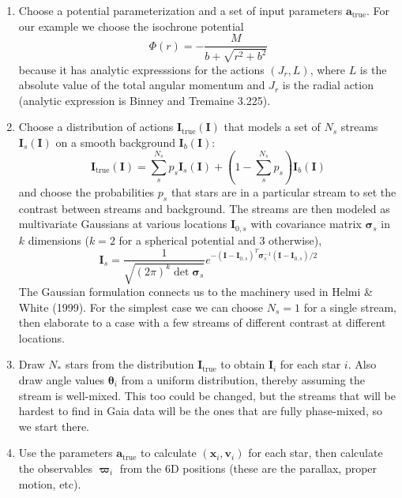 \documentclass[useAMS,usenatbib,a4paper,referee]{mn2e}
\newcommand{\sub}[2]{\ensuremath{#1_{\mathrm{#2}}}}
\begin{document}
\begin{enumerate}
 \item Choose a potential parameterization and a set of input parameters $\sub{\mathbf{a}}{true}$. For our example we choose the isochrone potential
\begin{equation}
 \Phi(r) = -\frac{M}{b+\sqrt{r^2+b^2}}
\end{equation} 
 because it has analytic expresssions for the actions $(J_r,L)$, where $L$ is the absolute value of the total angular momentum and $J_r$ is the radial action (analytic expression is Binney and Tremaine 3.225).
\item Choose a distribution of actions $\sub{\mathbf{I}}{true}(\mathbf{I})$ that models a set of $N_s$ streams $\mathbf{I}_s(\mathbf{I})$ on a smooth background $\mathbf{I}_b(\mathbf{I})$:
\begin{equation}
 \sub{\mathbf{I}}{true}(\mathbf{I}) = \sum_s^{N_s} p_s \mathbf{I}_s(\mathbf{I}) + (1-\sum_s^{N_s} p_s) \mathbf{I}_b(\mathbf{I})
\end{equation} 
and choose the probabilities $p_s$ that stars are in a particular stream to set the contrast between streams and background. The streams are then modeled as multivariate Gaussians at various locations $\mathbf{I}_{0,s}$ with covariance matrix $\mathbf{\sigma}_s$ in $k$ dimensions ($k=2$ for a spherical potential and 3 otherwise), 
\begin{equation}
 \mathbf{I}_s = \frac{1}{\sqrt{(2 \pi)^k \det \mathbf{\sigma}_s}} e^{-(\mathbf{I}-\mathbf{I}_{0,s})^T \mathbf{\sigma}_s^{-1} (\mathbf{I}-\mathbf{I}_{0,s})/2}
\end{equation} 
The Gaussian formulation connects us to the machinery used in Helmi \& White (1999). For the simplest case we can choose $N_s=1$ for a single stream, then elaborate to a case with a few streams of different contrast at different locations.

\item Draw $N_*$ stars from the distribution $\sub{\mathbf{I}}{true}$ to obtain $\mathbf{I}_i$ for each star $i$. Also draw angle values $\mathbf{\theta}_i$ from a uniform distribution, thereby assuming the stream is well-mixed. This too could be changed, but the streams that will be hardest to find in Gaia data will be the ones that are fully phase-mixed, so we start there.

\item Use the parameters $\sub{\mathbf{a}}{true}$ to calculate $(\mathbf{x}_i, \mathbf{v}_i)$ for each star, then calculate the observables $\mathbf{\varpi}_i$ from the 6D positions (these are the parallax, proper motion, etc). 


\end{enumerate}
\end{document}

